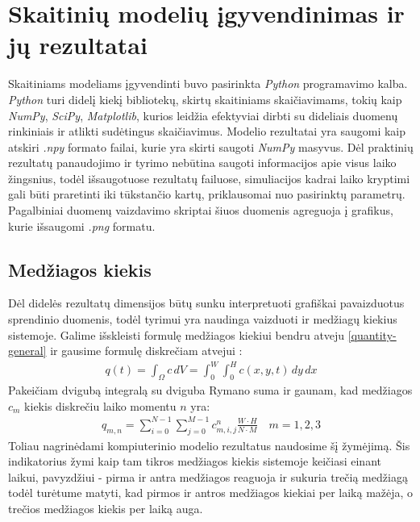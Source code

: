 \section{Skaitinių modelių įgyvendinimas ir jų rezultatai}
Skaitiniams modeliams įgyvendinti buvo pasirinkta \textit{Python} programavimo kalba. \textit{Python} turi didelį kiekį bibliotekų, skirtų skaitiniams skaičiavimams, tokių kaip \textit{NumPy}, \textit{SciPy}, \textit{Matplotlib}, kurios leidžia efektyviai dirbti su dideliais duomenų rinkiniais ir atlikti sudėtingus skaičiavimus. Modelio rezultatai yra saugomi kaip atskiri \textit{.npy} formato failai, kurie yra skirti saugoti \mbox{\textit{NumPy}} masyvus. Dėl praktinių rezultatų panaudojimo ir tyrimo nebūtina saugoti informacijos apie visus laiko žingsnius, todėl išsaugotuose rezultatų failuose, simuliacijos kadrai laiko kryptimi gali būti praretinti iki tūkstančio kartų, priklausomai nuo pasirinktų parametrų. Pagalbiniai duomenų vaizdavimo skriptai šiuos duomenis agreguoja į grafikus, kurie išsaugomi \textit{.png} formatu.
\subsection{Medžiagos kiekis}
Dėl didelės rezultatų dimensijos būtų sunku interpretuoti grafiškai pavaizduotus sprendinio duomenis, todėl tyrimui yra naudinga vaizduoti ir medžiagų kiekius sistemoje. Galime išskleisti formulę medžiagos kiekiui bendru atveju \eqref{quantity-general} ir gausime formulę diskrečiam atvejui \cite{strangCalculusVolume32016}:
\begin{align}
  q(t) = \int_\Omega c\,dV = \int_0^W \int_0^H c(x, y, t)\,dy\,dx
\end{align}
Pakeičiam dvigubą integralą su dviguba Rymano suma ir gaunam, kad medžiagos $c_m$ kiekis diskrečiu laiko momentu $n$ yra:
\begin{align}\label{eqs:numeric-quantity}
  q_{m, n}= \sum_{i=0}^{N-1}\sum_{j=0}^{M-1} c_{m, i,j}^n \frac{W\cdot H}{N\cdot M} \quad m=1, 2, 3
\end{align}
Toliau nagrinėdami kompiuterinio modelio rezultatus naudosime šį žymėjimą. Šis indikatorius žymi kaip tam tikros medžiagos kiekis sistemoje keičiasi einant laikui, pavyzdžiui - pirma ir antra medžiagos reaguoja ir sukuria trečią medžiagą todėl turėtume matyti, kad pirmos ir antros medžiagos kiekiai per laiką mažėja, o trečios medžiagos kiekis per laiką auga.

